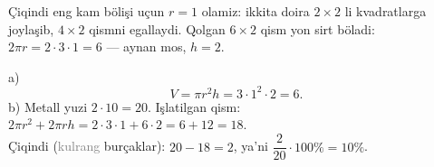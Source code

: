Çiqindi eng kam bölişi uçun $r=1$ olamiz: ikkita doira $2\times2$ li kvadratlarga joylaşib, $4\times2$ qismni egallaydi. Qolgan $6\times2$ qism yon sirt böladi: $2\pi r=2\cdot3\cdot1=6$ — aynan mos, $h=2$.

a) \[V=\pi r^2h=3\cdot1^2\cdot2=6.\]
b) Metall yuzi $2\cdot10=20$. Işlatilgan qism: $2\pi r^2+2\pi rh=2\cdot3\cdot1+6\cdot2=6+12=18$.\\
Çiqindi (\textcolor{gray}{kulrang} burçaklar): $20-18=2$, ya'ni $\dfrac{2}{20}\cdot100\%=10\%$.

\ShowJavoblar

